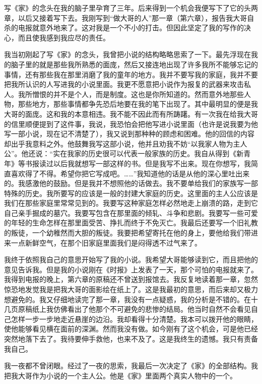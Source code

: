 \par 写《家》的念头在我的脑子里孕育了三年。后来得到一个机会我便写下了它的头两章，以后又接着写下去。我刚写到“做大哥的人”那一章（第六章），报告我大哥自杀的电报就意外地来了。这对我是一个不小的打击。但因此坚定了我的写作的决心，而且使我感到我应尽的责任。
\par 我当初刚起了写《家》的念头，我曾把小说的结构略略思索了一下。最先浮现在我的脑子里的就是那些我所熟悉的面庞，然后又接连地出现了许多我所不能够忘记的事情，还有那些我在那里消磨了我的童年的地方。我并不要写我的家庭，我并不要把我所认识的人写进我的小说里面。我更不愿意把小说作为报复的武器来攻击私人。我所憎恨的并不是个人，而是制度。这也是你所知道的。然而意外地那些人物，那些地方，那些事情都争先恐后地要在我的笔下出现了。其中最明显的便是我大哥的面庞。这和我的本意相违。我不能不因此而有所踌躇。有一次我在给我大哥的信里顺便提到了这件事，我说，我恐怕会把他写进小说里面（也许是说我要为他写一部小说，现在记不清楚了），我又说到那种种的顾虑和困难。他的回信的内容却出乎我意料之外。他鼓舞我写这部小说，他并且劝我不妨“以我家人物为主人公”。他还说：“实在我家的历史很可以代表一般家族的历史。我自从得到《新青年》等书报读过以后我就想写一部这样的书。但是我写不出来。现在你想写，我简直喜欢得了不得。希望你把它写成吧。……”我知道他的话是从他的深心里吐出来的。我感激他的鼓励。但是我并不想照他的话做去。我不要单给我们的家族写一部特殊的历史。我所要写的应该是一般的封建大家庭的历史。这里面的主人公应该是我们在那些家庭里常常见到的。我要写这种家庭怎样必然地走上崩溃的路，走到它自己亲手掘成的墓穴。我要写包含在那里面的倾轧、斗争和悲剧。我要写一些可爱的年轻的生命怎样在那里面受苦、挣扎而终于不免灭亡。我最后还要写一个旧礼教的叛徒，一个幼稚然而大胆的叛徒。我要把希望寄托在他的身上，要他给我们带进来一点新鲜空气，在那个旧家庭里面我们是闷得透不过气来了。
\par 我终于依照我自己的意思开始写了我的小说。我希望大哥能够读到它，而且把他的意见告诉我。但是我的小说刚在《时报》上发表了一天，那个可怕的电报就来了。我得到电报的晚上，第六章的原稿还不曾送到报馆去。我反复地读着那一章，忽然惊恐地发觉我是把我大哥的面影绘在纸上了。这是我最初的意思，而后来却又极力想避免的。我又仔细地读完了那一章，我没有一点疑惑，我的分析是不错的。在十几页原稿纸上我仿佛看出了他那个不可避免的悲惨的结局。他当时自然不会看见自己怎样一步一步地走近悬崖的边沿。我却看得十分清楚。我本可以拨开他的眼睛，使他能够看见横在面前的深渊。然而我没有做。如今刚有了这个机会，可是他已经突然地落下去了。我待要伸手救他，也来不及了。这是我终生的遗憾。我只有责备我自己。
\par 我一夜都不曾闭眼。经过了一夜的思索，我最后一次决定了《家》的全部结构。我把我大哥作为小说的一个主人公。他是《家》里面两个真实人物中的一个。
